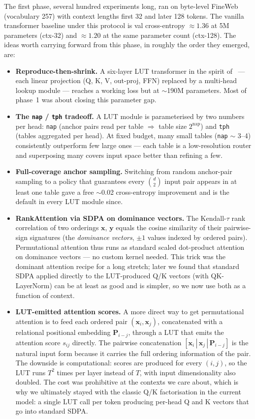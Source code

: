 \documentclass[11pt]{article}
\begin{document}
The first phase, several hundred experiments long, ran on byte-level FineWeb (vocabulary 257) with context lengths first 32 and later 128 tokens.
The vanilla transformer baseline under this protocol is val cross-entropy $\approx 1.36$ at 5M parameters (ctx-32) and $\approx 1.20$ at the same parameter count (ctx-128).
The ideas worth carrying forward from this phase, in roughly the order they emerged, are:
\begin{itemize}
\setlength{\itemsep}{2pt}
    \item \textbf{Reproduce-then-shrink.} A six-layer LUT transformer in the spirit of~\cite{ref:manifesto} --- each linear projection (Q, K, V, out-proj, FFN) replaced by a multi-head lookup module --- reaches a working loss but at $\sim$190M parameters. Most of phase~1 was about closing this parameter gap.
    \item \textbf{The \texttt{nap} / \texttt{tph} tradeoff.} A LUT module is parameterised by two numbers per head: \texttt{nap} (anchor pairs read per table $\Rightarrow$ table size $2^\text{nap}$) and \texttt{tph} (tables aggregated per head). At fixed budget, many small tables (\texttt{nap} $\sim$ 3--4) consistently outperform few large ones --- each table is a low-resolution router and superposing many covers input space better than refining a few.
    \item \textbf{Full-coverage anchor sampling.} Switching from random anchor-pair sampling to a policy that guarantees every $\binom{d}{2}$ input pair appears in at least one table gave a free $\sim$0.02 cross-entropy improvement and is the default in every LUT module since.
    \item \textbf{RankAttention via SDPA on dominance vectors.} The Kendall-$\tau$ rank correlation of two orderings $\mathbf{x}$, $\mathbf{y}$ equals the cosine similarity of their pairwise-sign signatures (the \emph{dominance vectors}, $\pm 1$ values indexed by ordered pairs). Permutational attention thus runs as standard scaled dot-product attention on dominance vectors --- no custom kernel needed. This trick was the dominant attention recipe for a long stretch; later we found that standard SDPA applied directly to the LUT-produced Q/K vectors (with QK-LayerNorm) can be at least as good and is simpler, so we now use both as a function of context.
    \item \textbf{LUT-emitted attention scores.} A more direct way to get permutational attention is to feed each ordered pair $(\mathbf{x}_i, \mathbf{x}_j)$, concatenated with a relational positional embedding $\mathbf{P}_{i-j}$, through a LUT that emits the attention score $s_{ij}$ directly. The pairwise concatenation $[\mathbf{x}_i \,|\, \mathbf{x}_j \,|\, \mathbf{P}_{i-j}]$ is the natural input form because it carries the full ordering information of the pair. The downside is computational: scores are produced for every $(i, j)$, so the LUT runs $T^2$ times per layer instead of $T$, with input dimensionality also doubled. The cost was prohibitive at the contexts we care about, which is why we ultimately stayed with the classic Q/K factorisation in the current model: a single LUT call per token producing per-head Q and K vectors that go into standard SDPA.

\end{itemize}
\end{document}
